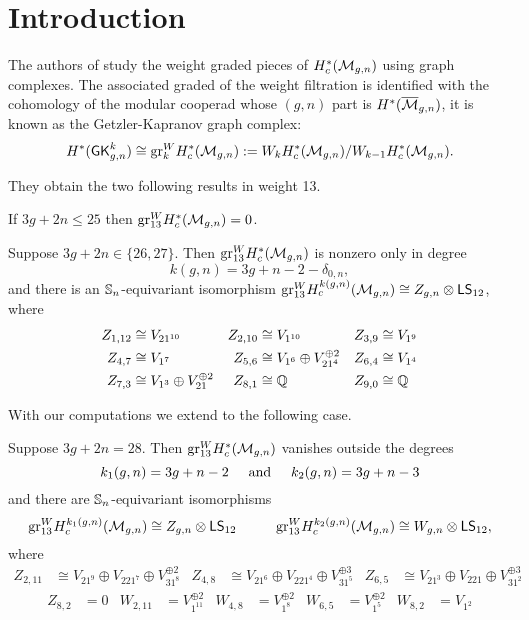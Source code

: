 



\section{Introduction}

The authors of \cite{CLPW2} study the weight graded pieces of $H^*_c(\M_{g,n})$ using graph complexes. The associated graded of the weight filtration is identified with the cohomology of the modular cooperad whose $(g,n)$ part is $H^*(\Mb_{g,n})$, it is known as the Getzler-Kapranov graph complex:
\begin{equation}
    H^*(\GK_{g,n}^k) \cong  \gr^W_k H^*_c(\M_{g,n}) := W_k H^*_c(\M_{g,n})/W_{k-1}H^*_c(\M_{g,n}).
\end{equation}

They obtain the two following results in weight 13.
\begin{prop}\label{prop:wt 13 vanishing}
    If $3g + 2n \leq 25$ then $\gr_{13}^W H^*_c(\M_{g,n}) = 0$.
\end{prop}

\begin{thm} \label{thm:lowexc13}
    Suppose $3g + 2n \in \{26, 27\}$. Then $\gr_{13}^W H^*_c(\M_{g,n})$ is nonzero only in degree $$k(g,n) = 3g + n - 2 - \delta_{0,n},$$ and there is an $\ss_n$-equivariant isomorphism $\gr_{13}^W H^{k(g,n)}_c(\cM_{g,n}) \cong Z_{g,n} \otimes \lstw$, where
\begin{align*}
    Z_{1,12} & \cong V_{21^{10}} & Z_{2,10} & \cong V_{1^{10}} & Z_{3,9} & \cong V_{1^{9}} \\
    Z_{4,7} & \cong V_{1^{7}} & Z_{5,6} & \cong V_{1^{6}} \oplus V_{21^4}^{\oplus 2} & Z_{6,4} & \cong V_{1^{4}} \\ Z_{7,3} & \cong V_{1^{3}} \oplus V_{21}^{\oplus 2}& Z_{8,1} & \cong \Q & Z_{9,0} & \cong \Q 
\end{align*}
\end{thm}

With our computations we extend to the following case.
\begin{thm} \label{thm:excess28}
    Suppose $3g + 2n =28$. Then $\gr_{13}^W H^*_c(\M_{g,n})$ vanishes outside the degrees $$k_1(g,n) = 3g + n - 2 \hspace{.5cm}\text{and}\hspace{.5cm} k_2(g,n) = 3g + n - 3$$ and there are $\ss_n$-equivariant isomorphisms $$ \gr_{13}^W H^{k_1(g,n)}_c(\cM_{g,n}) \cong Z_{g,n} \otimes \lstw  \hspace{1cm} \gr_{13}^W H^{k_2(g,n)}_c(\cM_{g,n}) \cong W_{g,n} \otimes \lstw , $$ where
\begin{align*}
    Z_{2,11} &\cong V_{21^{9}}\oplus V_{221^7} \oplus V_{31^8}^{\oplus 2} & Z_{4,8} &\cong V_{21^6}\oplus V_{221^4}\oplus V_{31^5}^{\oplus 3} & Z_{6,5} &\cong V_{21^3}\oplus V_{221}\oplus V_{31^2}^{\oplus 3}
\end{align*}
\begin{align*}
    Z_{8,2}&=0 &  W_{2,11}&=V_{1^{11}}^{\oplus 2} & W_{4,8}&=V_{1^8}^{\oplus 2} & W_{6,5}&=V_{1^5}^{\oplus 2} & W_{8,2}&=V_{1^2}
\end{align*}
\end{thm}